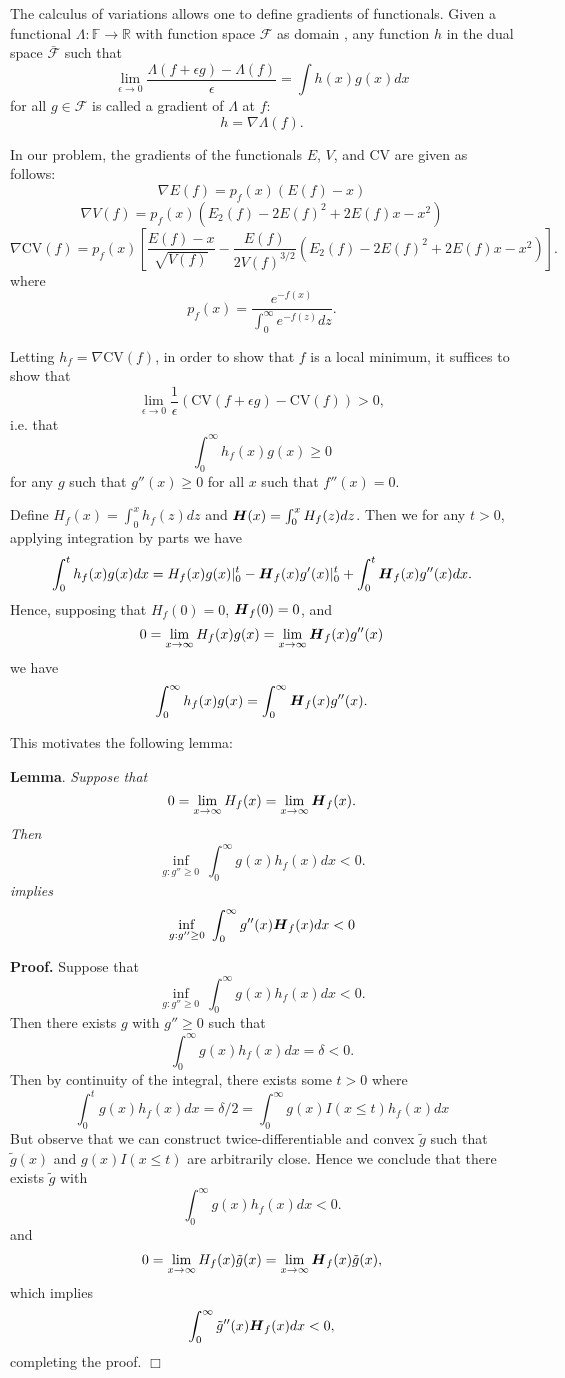 \documentclass[11pt]{article}
\begin{document}
The calculus of variations allows one to define gradients of functionals.
Given a functional $\Lambda : \mathbb{F} \to \mathbb{R}$ with function space $\mathcal{F}$ as domain , 
any function $h$ in the dual space $\bar{\mathcal{F}}$
 such that
\[
\lim_{\epsilon \to 0} \frac{\Lambda(f + \epsilon g) - \Lambda(f)}{\epsilon} = \int h(x) g(x) dx
\]
for all $g \in \mathcal{F}$
is called a gradient of $\Lambda$ at $f$:
\[h = \nabla \Lambda(f) .\]

In our problem, the gradients of the functionals $E$, $V$, and $\text{CV}$ are given as follows:
\[
\nabla E(f) = p_f(x) (E(f) - x)
\]
\[
\nabla V(f) = p_f(x) (E_2(f) - 2E(f)^2 + 2 E(f) x - x^2)
\]
\[
\nabla \text{CV}(f) = p_f(x) \left[
\frac{E(f) - x}{\sqrt{V(f)}} - \frac{E(f)}{2V(f)^{3/2}}\left(
E_2(f) - 2E(f)^2 + 2 E(f) x - x^2
\right)
\right].
\]
where
\[
p_f(x) = \frac{e^{-f(x)}}{\int_0^\infty e^{-f(z)} dz}.
\]

Letting $h_f = \nabla \text{CV}(f)$, in order to show that $f$ is a local minimum, it suffices to show that
\[
\lim_{\epsilon \to 0} \frac{1}{\epsilon}(\text{CV}(f + \epsilon g) - \text{CV}(f)) > 0,
\]
i.e. that
\[
\int_0^\infty h_f(x) g(x) \geq 0
\]
for any $g$ such that $g''(x) \geq 0$ for all $x$ such that $f''(x) = 0$.

Define $H_f(x) = \int_0^x h_f(z) dz$ and $\boldsymbol{H} (x) = \int_0^x H_f(z) dz$.
Then we for any $t > 0$, applying integration by parts we have
\[
\int_0^t h_f(x) g(x) dx = H_f(x) g(x) |_0^t - \boldsymbol{H}_f (x) g'(x)|_0^t + \int_0^t \boldsymbol{H}_f(x) g''(x) dx.
\]
Hence, supposing that $H_f(0) = 0$, $\boldsymbol{H}_f(0) = 0$, and
\[
0 = \lim_{x \to \infty} H_f(x) g(x) = \lim_{x \to \infty} \boldsymbol{H}_f (x) g''(x)
\]
we have
\[
\int_0^\infty h_f(x) g(x) = \int_0^\infty \boldsymbol{H}_f(x) g''(x).
\]

This motivates the following lemma:

\noindent\textbf{Lemma}. \emph{
Suppose that 
\[0 = \lim_{x \to \infty} H_f(x) = \lim_{x \to \infty} \boldsymbol{H}_f(x).\]
Then
\[
\inf_{g: g'' \geq 0}\ \int_0^\infty g(x) h_f(x) dx < 0.
\]
implies
\[
\inf_{g: g'' \geq 0}\ \int_0^\infty g''(x) \boldsymbol{H}_f(x) dx < 0
\]
}

\noindent \textbf{Proof.}  
Suppose that
\[
\inf_{g: g'' \geq 0}\ \int_0^\infty g(x) h_f(x) dx < 0.
\]
Then there exists $g$ with $g'' \geq 0$ such that
\[
\int_0^\infty g(x) h_f(x) dx  = \delta < 0.
\]
Then by continuity of the integral, there exists some $t > 0$ where
\[
\int_0^t g(x) h_f(x) dx = \delta/2 = \int_0^\infty g(x) I(x \leq t) h_f(x) dx
\]
But observe that we can construct twice-differentiable and convex
$\tilde{g}$ such that $\tilde{g}(x)$ and $g(x)I(x \leq t)$ are
arbitrarily close.  Hence we conclude that there exists
$\tilde{g}$ with
\[
\int_0^\infty g(x) h_f(x) dx  < 0.
\]
and
\[
0 = \lim_{x \to \infty} H_f(x) \tilde{g}(x) = \lim_{x \to \infty} \boldsymbol{H}_f(x) \tilde{g}(x),
\]
which implies
\[
\int_0^\infty \tilde{g}''(x) \boldsymbol{H}_f(x) dx < 0,
\]
completing the proof. $\Box$
\end{document}
